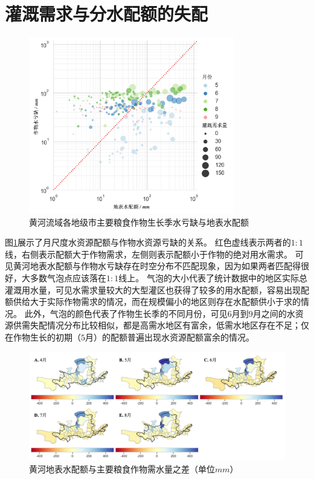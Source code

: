 \section{灌溉需求与分水配额的失配}

\begin{figure}[htb]
    \centering
    \includegraphics[width=0.8\textwidth]{img/ch6/ch6_matches.png}
    \caption{黄河流域各地级市主要粮食作物生长季水亏缺与地表水配额}\label{ch6:fig:matches}
\end{figure}

图\ref{ch6:fig:matches}展示了月尺度水资源配额与作物水资源亏缺的关系。
红色虚线表示两者的$1:1$线，右侧表示配额大于作物需求，左侧则表示配额小于作物的绝对用水需求。
可见黄河地表水配额与作物水亏缺存在时空分布不匹配现象，因为如果两者匹配得很好，大多数气泡点应该落在$1:1$线上。
气泡的大小代表了统计数据中的地区实际总灌溉用水量，可见水需求量较大的大型灌区也获得了较多的用水配额，容易出现配额供给大于实际作物需求的情况，而在规模偏小的地区则存在水配额供小于求的情况。
此外，气泡的颜色代表了作物生长季的不同月份，可见$6$月到$9$月之间的水资源供需失配情况分布比较相似，都是高需水地区有富余，低需水地区存在不足；仅在作物生长的初期（$5$月）的配额普遍出现水资源配额富余的情况。

\begin{figure}[htb]
    \centering
    \includegraphics[width=\textwidth]{img/ch6/ch6_deficits_map.png}
    \caption[黄河地表水配额与主要粮食作物需水量之差]{黄河地表水配额与主要粮食作物需水量之差（单位$mm$）}\label{ch6:fig:deficits_maps}
\end{figure}

